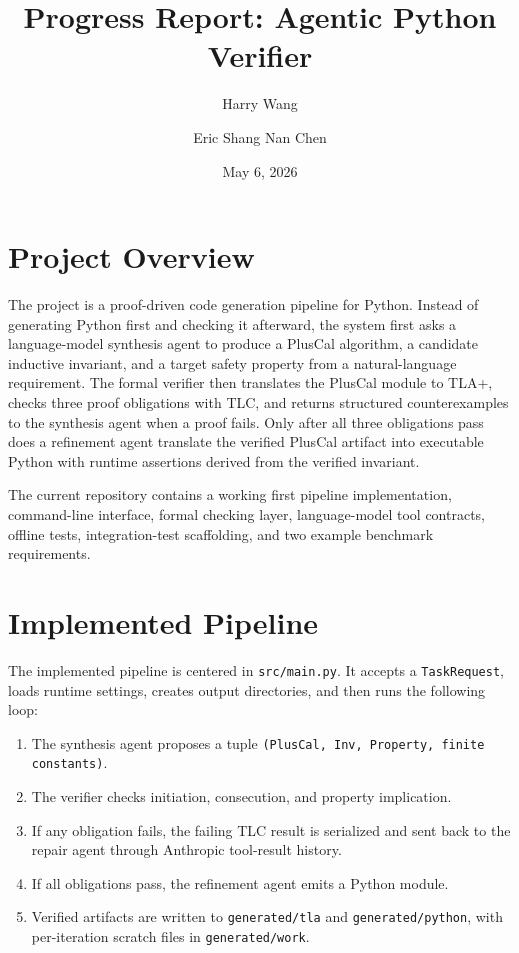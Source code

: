 \documentclass[11pt]{article}
\title{Progress Report: Agentic Python Verifier}
\author{Harry Wang \and Eric Shang Nan Chen}
\date{May 6, 2026}
\begin{document}
\maketitle

\section{Project Overview}

The project is a proof-driven code generation pipeline for Python. Instead of
generating Python first and checking it afterward, the system first asks a
language-model synthesis agent to produce a PlusCal algorithm, a candidate
inductive invariant, and a target safety property from a natural-language
requirement. The formal verifier then translates the PlusCal module to TLA+,
checks three proof obligations with TLC, and returns structured
counterexamples to the synthesis agent when a proof fails. Only after all
three obligations pass does a refinement agent translate the verified PlusCal
artifact into executable Python with runtime assertions derived from the
verified invariant.

The current repository contains a working first pipeline implementation,
command-line interface, formal checking layer, language-model tool contracts,
offline tests, integration-test scaffolding, and two example benchmark
requirements.

\section{Implemented Pipeline}

The implemented pipeline is centered in \texttt{src/main.py}. It accepts a
\texttt{TaskRequest}, loads runtime settings, creates output directories, and
then runs the following loop:

\begin{enumerate}
  \item The synthesis agent proposes a tuple
  \texttt{(PlusCal, Inv, Property, finite constants)}.
  \item The verifier checks initiation, consecution, and property implication.
  \item If any obligation fails, the failing TLC result is serialized and sent
  back to the repair agent through Anthropic tool-result history.
  \item If all obligations pass, the refinement agent emits a Python module.
  \item Verified artifacts are written to \texttt{generated/tla} and
  \texttt{generated/python}, with per-iteration scratch files in
  \texttt{generated/work}.
\end{enumerate}
\end{document}

